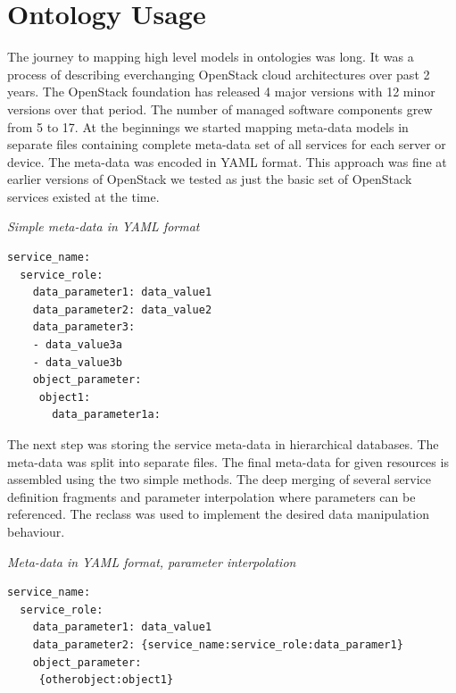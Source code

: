 
\section{Ontology Usage}
\label{chap:usage}


The journey to mapping high level models in ontologies was long. It was a process of describing everchanging OpenStack cloud architectures over past 2 years. The OpenStack foundation has released 4 major versions with 12 minor versions over that period. The number of managed software components grew from 5 to 17. At the beginnings we started mapping meta-data models in separate files containing complete meta-data set of all services for each server or device. The meta-data was encoded in YAML format. This approach was fine at earlier versions of OpenStack we tested as just the basic set of OpenStack services existed at the time. 

\medskip

\noindent
{\it Simple meta-data in YAML format}
\begin{verbatim}
service_name:
  service_role:
    data_parameter1: data_value1
    data_parameter2: data_value2
    data_parameter3:
    - data_value3a
    - data_value3b    
    object_parameter:
     object1:
       data_parameter1a: 
\end{verbatim}
\noindent

The next step was storing the service meta-data in hierarchical databases. The meta-data was split into separate files. The final meta-data for given resources is assembled using the two simple methods. The deep merging of several service definition fragments and parameter interpolation where parameters can be referenced. The reclass \cite{Reclass} was used to implement the desired data manipulation behaviour.

\medskip

\noindent
{\it Meta-data in YAML format, parameter interpolation}
\begin{verbatim}
service_name:
  service_role:
    data_parameter1: data_value1
    data_parameter2: {service_name:service_role:data_paramer1}
    object_parameter:
     {otherobject:object1}
\end{verbatim}
\noindent

